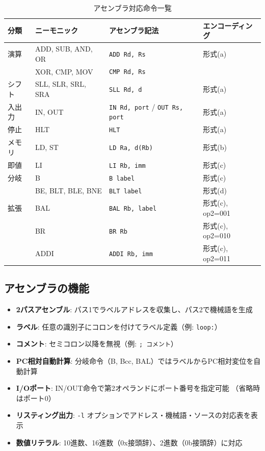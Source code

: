 \documentclass[a4paper,11pt]{ltjsarticle}
\begin{document}
\begin{table}[h]
\centering
\caption{アセンブラ対応命令一覧}
\small
\begin{tabular}{llll}
\toprule
分類 & ニーモニック & アセンブラ記法 & エンコーディング \\
\midrule
演算   & ADD, SUB, AND, OR & \texttt{ADD Rd, Rs} & 形式(a) \\
       & XOR, CMP, MOV    & \texttt{CMP Rd, Rs} & \\
シフト & SLL, SLR, SRL, SRA & \texttt{SLL Rd, d} & 形式(a) \\
入出力 & IN, OUT           & \texttt{IN Rd, port} / \texttt{OUT Rs, port} & 形式(a) \\
停止   & HLT               & \texttt{HLT} & 形式(a) \\
\midrule
メモリ & LD, ST            & \texttt{LD Ra, d(Rb)} & 形式(b) \\
\midrule
即値   & LI                & \texttt{LI Rb, imm} & 形式(c) \\
分岐   & B                 & \texttt{B label} & 形式(c) \\
       & BE, BLT, BLE, BNE & \texttt{BLT label} & 形式(d) \\
\midrule
拡張   & BAL               & \texttt{BAL Rb, label} & 形式(c), op2=001 \\
       & BR                & \texttt{BR Rb} & 形式(c), op2=010 \\
       & ADDI              & \texttt{ADDI Rb, imm} & 形式(c), op2=011 \\
\bottomrule
\end{tabular}
\end{table}

\subsection{アセンブラの機能}

\begin{itemize}
\item \textbf{2パスアセンブル}: パス1でラベルアドレスを収集し、パス2で機械語を生成
\item \textbf{ラベル}: 任意の識別子にコロンを付けてラベル定義（例: \texttt{loop:}）
\item \textbf{コメント}: セミコロン以降を無視（例: \texttt{; コメント}）
\item \textbf{PC相対自動計算}: 分岐命令（B, Bcc, BAL）ではラベルからPC相対変位を自動計算
\item \textbf{I/Oポート}: IN/OUT命令で第2オペランドにポート番号を指定可能
  （省略時はポート0）
\item \textbf{リスティング出力}: \texttt{-l} オプションでアドレス・機械語・ソースの対応表を表示
\item \textbf{数値リテラル}: 10進数、16進数（0x接頭辞）、2進数（0b接頭辞）に対応
\end{itemize}
\end{document}
